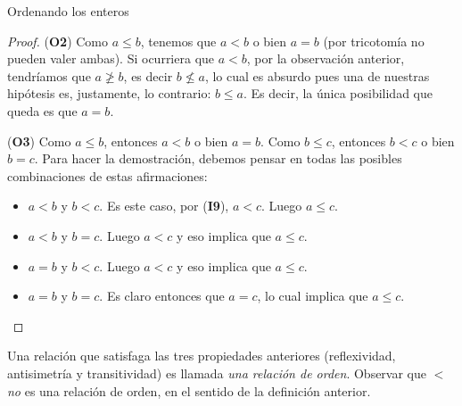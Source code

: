 \begin{section}{Ordenando los enteros}
\begin{ejemplo}
\begin{proof}
({\bf O2}) Como $a \le b$, tenemos que $a<b$ o bien $a=b$ (por tricotomía no pueden valer ambas). Si ocurriera que $a<b$, por la observación anterior, tendríamos que $a\not\ge b$, es decir $b\not\le a$, lo cual es absurdo pues una de nuestras hipótesis es,  justamente, lo contrario:  $b \le a$.  Es decir, la única posibilidad que queda es que $a=b$.     

({\bf O3}) Como $a\le b$, entonces $a <b$ o bien $a=b$. Como $b\le c$, entonces $b<c$ o bien $b=c$. Para hacer la demostración, debemos pensar en todas las posibles combinaciones de estas afirmaciones:
\begin{itemize}
	\item $a<b$ y $b<c$. Es este caso, por  ({\bf I9}), $a<c$. Luego $a\le c$.
	
	\item $a<b$ y $b=c$. Luego $a<c$ y eso implica que $a\le c$.
	
	\item $a=b$ y $b<c$. Luego $a<c$ y eso implica que $a\le c$.
	
	\item $a=b$ y $b=c$. Es claro entonces que $a=c$, lo cual implica que $a\le c$.
\end{itemize}	
\end{proof}
\end{ejemplo}

Una relación que satisfaga las tres propiedades anteriores (reflexividad, antisimetría y transitividad) es llamada {\em una relación de orden}. Observar que $<$ {\em no} es una relación de orden, en el sentido de la definición anterior. 

%




\end{section}
